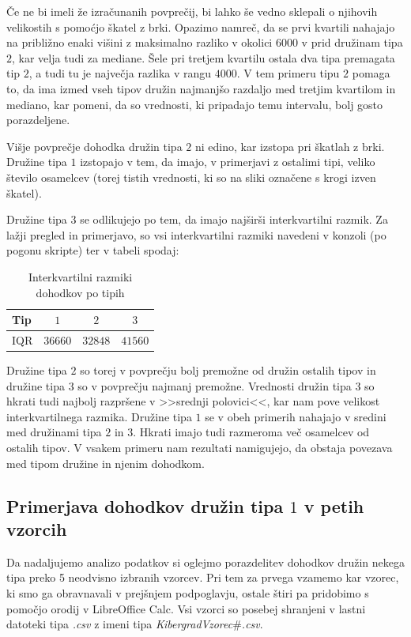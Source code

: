 \documentclass[a4paper, 10pt]{article}
\begin{document}
	Če ne bi imeli že izračunanih povprečij, bi lahko še vedno sklepali o njihovih velikostih s pomoćjo škatel z brki. Opazimo namreč, da se prvi kvartili nahajajo na približno enaki višini z maksimalno razliko v okolici $6000$ v prid družinam tipa $2$, kar velja tudi za mediane. Šele pri tretjem kvartilu ostala dva tipa premagata tip $2$, a tudi tu je največja razlika v rangu $4000$. V tem primeru tipu $2$ pomaga to, da ima izmed vseh tipov družin najmanjšo razdaljo med tretjim kvartilom in mediano, kar pomeni, da so vrednosti, ki pripadajo temu intervalu, bolj gosto porazdeljene.

	Višje povprečje dohodka družin tipa $2$ ni edino, kar izstopa pri škatlah z brki. Družine tipa $1$ izstopajo v tem, da imajo, v primerjavi z ostalimi tipi, veliko število osamelcev (torej tistih vrednosti, ki so na sliki označene s krogi izven škatel).

	Družine tipa $3$ se odlikujejo po tem, da imajo najširši interkvartilni razmik. Za lažji pregled in primerjavo, so vsi interkvartilni razmiki navedeni v konzoli (po pogonu skripte) ter v tabeli spodaj:
	\begin{table}[h!]
		\label{tab: IQRA}
		\centering
		\begin{tabular}{|l|c|c|c|}
			\hline
			Tip & $1$ & $2$ & $3$ \\ \hline
			IQR & $36660$ & $32848$ & $41560$ \\ \hline
		\end{tabular}
		\caption{Interkvartilni razmiki dohodkov po tipih}
	\end{table}

	Družine tipa $2$ so torej v povprečju bolj premožne od družin ostalih tipov in družine tipa $3$ so v povprečju najmanj premožne. Vrednosti družin tipa $3$ so hkrati tudi najbolj razpršene v >>srednji polovici<<, kar nam pove velikost interkvartilnega razmika. Družine tipa $1$ se v obeh primerih nahajajo v sredini med družinami tipa $2$ in $3$. Hkrati imajo tudi razmeroma več osamelcev od ostalih tipov. V vsakem primeru nam rezultati namigujejo, da obstaja povezava med tipom družine in njenim dohodkom.
	\newpage
	\subsection{Primerjava dohodkov družin tipa $1$ v petih vzorcih}\label{subsect: 1B}
	Da nadaljujemo analizo podatkov si oglejmo porazdelitev dohodkov družin nekega tipa preko 5 neodvisno izbranih vzorcev. Pri tem za prvega vzamemo kar vzorec, ki smo ga obravnavali v prejšnjem podpoglavju, ostale štiri pa pridobimo s pomočjo orodij v LibreOffice Calc. Vsi vzorci so posebej shranjeni v lastni datoteki tipa \textit{.csv} z imeni tipa \textit{KibergradVzorec$\#$.csv}.
\end{document}
